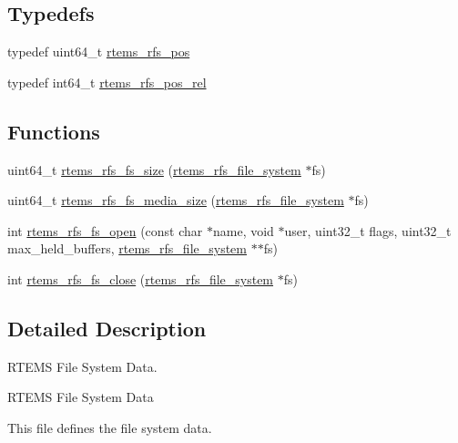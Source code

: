 \subsection*{Typedefs}
\begin{DoxyCompactItemize}
\item 
typedef uint64\+\_\+t \mbox{\hyperlink{rtems-rfs-file-system_8h_ae6adc04fe673c46403605d64f16699bd}{rtems\+\_\+rfs\+\_\+pos}}
\item 
typedef int64\+\_\+t \mbox{\hyperlink{rtems-rfs-file-system_8h_af6bccb465dcd34c68e9f0c214950ef57}{rtems\+\_\+rfs\+\_\+pos\+\_\+rel}}
\end{DoxyCompactItemize}
\subsection*{Functions}
\begin{DoxyCompactItemize}
\item 
uint64\+\_\+t \mbox{\hyperlink{rtems-rfs-file-system_8h_a0c8274793080a83d483e966475ccc2a5}{rtems\+\_\+rfs\+\_\+fs\+\_\+size}} (\mbox{\hyperlink{struct__rtems__rfs__file__system}{rtems\+\_\+rfs\+\_\+file\+\_\+system}} $\ast$fs)
\item 
uint64\+\_\+t \mbox{\hyperlink{rtems-rfs-file-system_8h_a8380bd35ff8e755dc1fe18f2de156f3c}{rtems\+\_\+rfs\+\_\+fs\+\_\+media\+\_\+size}} (\mbox{\hyperlink{struct__rtems__rfs__file__system}{rtems\+\_\+rfs\+\_\+file\+\_\+system}} $\ast$fs)
\item 
int \mbox{\hyperlink{rtems-rfs-file-system_8h_a33a063dea6be2f3fe7c5f4f9de07dd0c}{rtems\+\_\+rfs\+\_\+fs\+\_\+open}} (const char $\ast$name, void $\ast$user, uint32\+\_\+t flags, uint32\+\_\+t max\+\_\+held\+\_\+buffers, \mbox{\hyperlink{struct__rtems__rfs__file__system}{rtems\+\_\+rfs\+\_\+file\+\_\+system}} $\ast$$\ast$fs)
\item 
int \mbox{\hyperlink{rtems-rfs-file-system_8h_af161538fcc5d88a33ec4b74ce530ae93}{rtems\+\_\+rfs\+\_\+fs\+\_\+close}} (\mbox{\hyperlink{struct__rtems__rfs__file__system}{rtems\+\_\+rfs\+\_\+file\+\_\+system}} $\ast$fs)
\end{DoxyCompactItemize}


\subsection{Detailed Description}
R\+T\+E\+MS File System Data. 

R\+T\+E\+MS File System Data

This file defines the file system data. 

